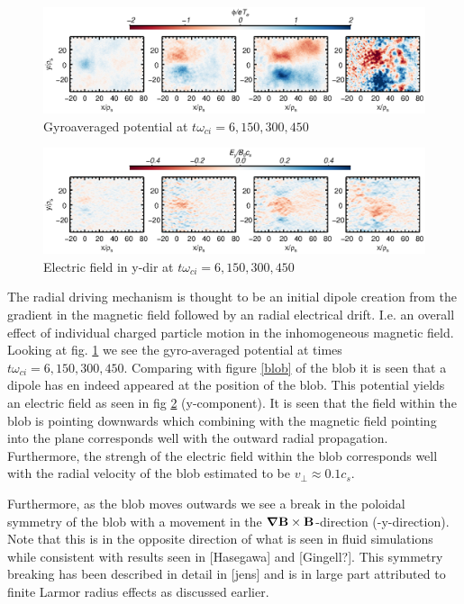 \documentclass[9pt,twocolumn]{article}
\newcommand{\gv}[1]{\ensuremath{\mbox{\boldmath$ #1 $}}}
\newcommand{\fd}[1]{\mathbf{#1}}
\newcommand{\grad}[1]{\gv{\nabla} #1} %
\renewcommand{\=}[1]{\stackrel{#1}{=}} %
\theoremstyle{definition}
\theoremstyle{remark}
\begin{document}
\begin{figure}[h]
  \includegraphics[trim=0mm 128mm 0mm 0mm,width=\textwidth]{Pictures/threephitot.eps}
  \caption{Gyroaveraged potential at $t\omega_{ci}={6,150,300,450}$}
  \label{pot}
\end{figure}

\begin{figure}[h]
  \includegraphics[trim=0mm 128mm 0mm 0mm,width=\textwidth]{Pictures/eytot.eps}
  \caption{Electric field in y-dir at $t\omega_{ci}={6,150,300,450}$}
  \label{efield}
\end{figure}


The radial driving mechanism is thought to be an initial dipole creation from the gradient in the magnetic field followed by an radial electrical drift. I.e. an overall effect of individual charged particle motion in the inhomogeneous magnetic field. Looking at fig. \ref{pot} we see the gyro-averaged potential at times $t\omega_{ci}={6,150,300,450}$. Comparing with figure \ref{blob} of the blob it is seen that a dipole has en indeed appeared at the position of the blob. 
This potential yields an electric field as seen in fig \ref{efield} (y-component). It is seen that the field within the blob is pointing downwards which combining with the magnetic field pointing into the plane corresponds well with the outward radial propagation. Furthermore, the strengh of the electric field within the blob corresponds well with the radial velocity of the blob estimated to be $v_\perp \approx 0.1c_s$. 

Furthermore, as the blob moves outwards we see a break in the poloidal symmetry of the blob with a movement in the $\grad \fd B\times \fd B$-direction (-y-direction). Note that this is in the opposite direction of what is seen in fluid simulations while consistent with results seen in [Hasegawa] and [Gingell?]. This symmetry breaking has been described in detail in [jens] and is in large part attributed to finite Larmor radius effects as discussed earlier. 
\end{document}
